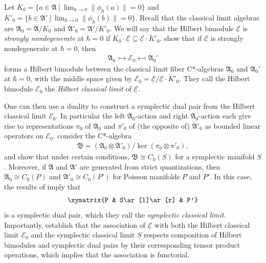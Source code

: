 \documentclass[sn-mathphys,Numbered]{sn-jnl}
\providecommand{\norm}[1]{\lVert#1\rVert}
\begin{document}
Let $K_0 = \{a\in\mathfrak{A}\ |\ \lim_{\hbar\to 0}\norm{\phi_{\hbar}(a)} = 0\}$ and $K'_0 = \{b\in\mathfrak{A}'\ |\ \lim_{\hbar\to 0}\norm{\phi_{\hbar}(b)} = 0\}$.  Recall that the classical limit algebras are $\mathfrak{A}_0 = \mathfrak{A}/K_0$ and $\mathfrak{A}'_0 = \mathfrak{A}'/K'_0$.
We will say that the Hilbert bimodule $\underline{\mathcal{E}}$ is \emph{strongly nondegenerate} at $\hbar = 0$ if $\overline{K_0\cdot \underline{\mathcal{E}}}\subseteq \overline{\underline{\mathcal{E}}\cdot K'_0}$.  \citet{FeSt24} show that if $\underline{\mathcal{E}}$ is strongly nondegenerate at $\hbar= 0$, then
\begin{align}
    \mathfrak{A}_0\rightarrowtail\mathcal{E}_0\leftarrowtail\mathfrak{A}_0'
\end{align}
forms a Hilbert bimodule between the classical limit fiber C*-algebras  $\mathfrak{A}_0$ and $\mathfrak{A}_0'$ at $\hbar = 0$, with the middle space given by $\mathcal{E}_0 = \underline{\mathcal{E}}/\overline{\underline{\mathcal{E}}\cdot K'_0}$.  They call the Hilbert bimodule $\mathcal{E}_0$ the \emph{Hilbert classical limit} of $\underline{\mathcal{E}}$.

One can then use a duality to construct a symplectic dual pair from the Hilbert classical limit $\mathcal{E}_0$.  In particular the left $\mathfrak{A}_0$-action and right $\mathfrak{A}_0$-action each give rise to representations $\pi_0$ of $\mathfrak{A}_0$ and $\pi'_0$ of (the opposite of) $\mathfrak{A}'_0$ as bounded linear operators on $\mathcal{E}_0$.  \citet{FeSt24} consider the C*-algebra
\begin{align}
    \mathfrak{B} = (\mathfrak{A}_0\otimes\mathfrak{A}'_0)/\ker(\pi_0\otimes \pi'_0),
\end{align}
and show that under certain conditions, $\mathfrak{B}\cong C_0(S)$ for a symplectic manifold $S$.  Moreover, if $\mathfrak{A}$ and $\mathfrak{A}'$ are generated from strict quantizations, then $\mathfrak{A}_0\cong C_0(P)$ and $\mathfrak{A}'_0\cong C_0(P')$ for Poisson manifolds $P$ and $P'$.  In this case, the results of \citet{FeSt24} imply that
\begin{align}
   \xymatrix{P & S\ar[l]\ar[r] & P'}
\end{align}
is a symplectic dual pair, which they call the \emph{symplectic classical limit}.  Importantly, \citet{FeSt24} establish that the association of $\underline{\mathcal{E}}$ with both the Hilbert classical limit $\mathcal{E}_0$ and the symplectic classical limit $S$ respects composition of Hilbert bimodules and symplectic dual pairs by their corresponding tensor product operations, which implies that the association is functorial. 
\end{document}
